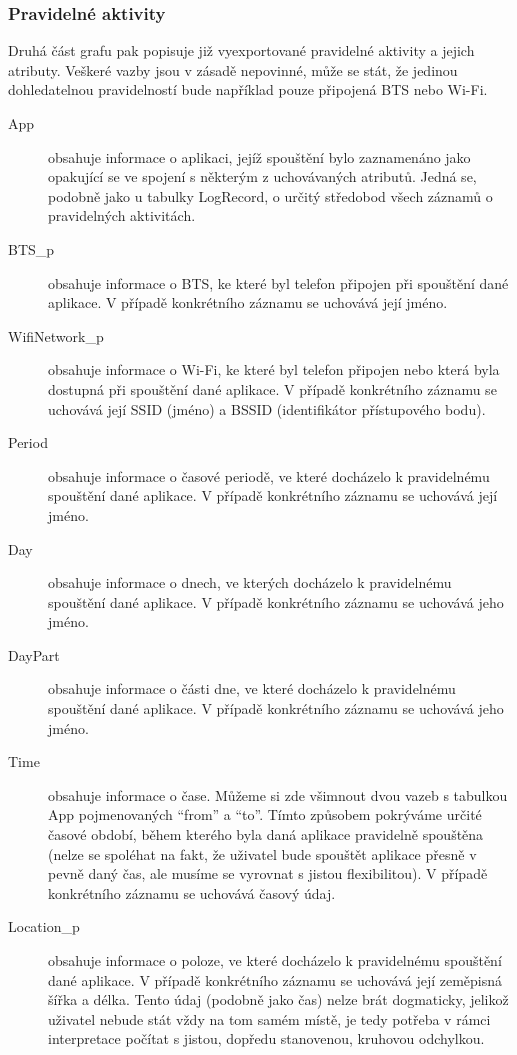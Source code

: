\documentclass[thesis=M,czech]{FITthesis}[2012/06/26]
\begin{document}
\subsubsection*{Pravidelné aktivity}
Druhá část grafu pak popisuje již vyexportované pravidelné aktivity a jejich atributy. Veškeré vazby jsou v zásadě nepovinné, může se stát, že jedinou dohledatelnou pravidelností bude například pouze připojená BTS nebo Wi-Fi.

\begin{description}
\item[App]
obsahuje informace o aplikaci, jejíž spouštění bylo zaznamenáno jako opakující se ve spojení s některým z uchovávaných atributů. Jedná se, podobně jako u tabulky LogRecord, o určitý středobod všech záznamů o pravidelných aktivitách.

\item[BTS\_p]
obsahuje informace o BTS, ke které byl telefon připojen při spouštění dané aplikace. V případě konkrétního záznamu se uchovává její jméno.

\item[WifiNetwork\_p]
obsahuje informace o Wi-Fi, ke které byl telefon připojen nebo která byla dostupná při spouštění dané aplikace. V případě konkrétního záznamu se uchovává její SSID (jméno) a BSSID (identifikátor přístupového bodu).

\item[Period]
obsahuje informace o časové periodě, ve které docházelo k pravidelnému spouštění dané aplikace. V případě konkrétního záznamu se uchovává její jméno.

\item[Day]
obsahuje informace o dnech, ve kterých docházelo k pravidelnému spouštění dané aplikace. V případě konkrétního záznamu se uchovává jeho jméno.

\item[DayPart]
obsahuje informace o části dne, ve které docházelo k pravidelnému spouštění dané aplikace. V případě konkrétního záznamu se uchovává jeho jméno.

\item[Time]
obsahuje informace o čase. Můžeme si zde všimnout dvou vazeb s tabulkou App pojmenovaných “from” a “to”. Tímto způsobem pokrýváme určité časové období, během kterého byla daná aplikace pravidelně spouštěna (nelze se spoléhat na fakt, že uživatel bude spouštět aplikace přesně v pevně daný čas, ale musíme se vyrovnat s jistou flexibilitou). V případě konkrétního záznamu se uchovává časový údaj.

\item[Location\_p]
obsahuje informace o poloze, ve které docházelo k pravidelnému spouštění dané aplikace. V případě konkrétního záznamu se uchovává její zeměpisná šířka a délka. Tento údaj (podobně jako čas) nelze brát dogmaticky, jelikož uživatel nebude stát vždy na tom samém místě, je tedy potřeba v rámci interpretace počítat s jistou, dopředu stanovenou, kruhovou odchylkou.
\end{description}
\end{document}
